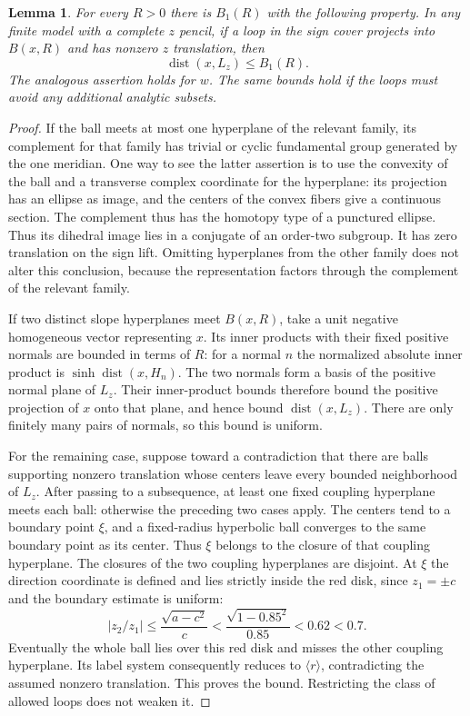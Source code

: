 \documentclass[11pt,reqno]{amsart}
\numberwithin{equation}{section}
\newtheorem{lemma}[theorem]{Lemma}
\theoremstyle{definition}
\theoremstyle{remark}
\begin{document}
\begin{lemma}\label{mod:buffer-bound}
For every $R>0$ there is $B_1(R)$ with the following property.
In any finite model with a complete $z$ pencil, if a loop in the
sign cover projects into $B(x,R)$ and has nonzero $z$ translation,
then
\[
 \operatorname{dist}(x,L_z)\le B_1(R).
\]
The analogous assertion holds for $w$.  The same bounds hold if
the loops must avoid any additional analytic subsets.
\end{lemma}
\begin{proof}
If the ball meets at most one hyperplane of the relevant family,
its complement for that family has trivial or cyclic fundamental
group generated by the one meridian.  One way to see the latter
assertion is to use the convexity of the ball and a transverse
complex coordinate for the hyperplane: its projection has an
ellipse as image, and the centers of the convex fibers give a
continuous section.  The complement thus has the homotopy type
of a punctured ellipse.  Thus its dihedral image lies in a
conjugate of an order-two subgroup.  It has zero translation on
the sign lift.  Omitting hyperplanes from the other family does
not alter this conclusion, because the representation factors
through the complement of the relevant family.

If two distinct slope hyperplanes meet $B(x,R)$, take a unit
negative homogeneous vector representing $x$.  Its inner products
with their fixed positive normals are bounded in terms of $R$:
for a normal $n$ the normalized absolute inner product is
$\sinh\operatorname{dist}(x,H_n)$.  The two normals form a basis of the positive
normal plane of $L_z$.  Their inner-product bounds therefore bound
the positive projection of $x$ onto that plane, and hence bound
$\operatorname{dist}(x,L_z)$.  There are only finitely many pairs of normals,
so this bound is uniform.

For the remaining case, suppose toward a contradiction that there
are balls supporting nonzero translation whose centers leave every
bounded neighborhood of $L_z$.  After passing to a subsequence,
at least one fixed coupling hyperplane meets each ball: otherwise
the preceding two cases apply.  The centers tend to a boundary
point $\xi$, and a fixed-radius hyperbolic ball converges to the
same boundary point as its center.  Thus $\xi$ belongs to the
closure of that coupling hyperplane.  The closures of the two
coupling hyperplanes are disjoint.  At $\xi$ the direction coordinate
is defined and lies strictly inside the red disk, since $z_1=\pm c$
and the boundary estimate is uniform:
\[
 |z_2/z_1|\le\frac{\sqrt{a-c^2}}{c}
 <\frac{\sqrt{1-0.85^2}}{0.85}<0.62<0.7.
\]
Eventually the whole ball lies over this red disk and misses the
other coupling hyperplane.  Its label system consequently reduces
to $\langle r\rangle$, contradicting the assumed nonzero
translation.  This proves the bound.  Restricting the class of
allowed loops does not weaken it.
\end{proof}
\end{document}
